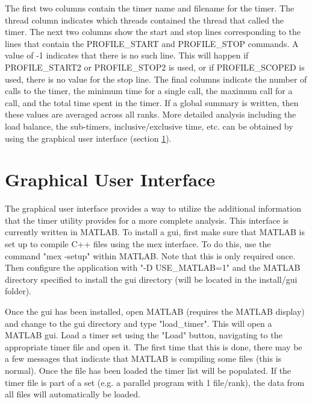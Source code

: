 \documentclass[fleqn,10pt,letterpaper]{article}
\begin{document}
The first two columns contain the timer name and filename for the timer.  
The thread column indicates which threads contained the thread that called the timer.
The next two columns show the start and stop lines corresponding to the lines that
contain the PROFILE\_START and PROFILE\_STOP commands.  A value of -1 indicates that
there is no such line.  This will happen if PROFILE\_START2 or PROFILE\_STOP2 is used,
or if PROFILE\_SCOPED is used, there is no value for the stop line.  
The final columns indicate the number of calls to the timer, the minimum time for a
single call, the maximum call for a call, and the total time spent in the timer.  
If a global summary is written, then these values are averaged across all ranks.  
More detailed analysis including the load balance, the sub-timers, inclusive/exclusive
time, etc. can be obtained by using the graphical user interface (section \ref{sec:gui}).  



\section{Graphical User Interface}  \label{sec:gui}

The graphical user interface provides a way to utilize the additional information
that the timer utility provides for a more complete analysis.  This interface 
is currently written in MATLAB.  To install a gui, first make sure that MATLAB
is set up to compile C++ files using the mex interface.  To do this, use the command
"mex -setup" within MATLAB.  Note that this is only required once.  Then configure 
the application with "-D USE\_MATLAB=1" and the MATLAB directory specified to install 
the gui directory (will be located in the install/gui folder).  

Once the gui has been installed, open MATLAB (requires the MATLAB display) and 
change to the gui directory and type "load\_timer".  This will open a MATLAB gui.  
Load a timer set using the "Load" button, navigating to the appropriate timer 
file and open it.  The first time that this is done, there may be a few messages 
that indicate that MATLAB is compiling some files (this is normal).  
Once the file has been loaded the timer list will be populated.  If the timer file
is part of a set (e.g. a parallel program with 1 file/rank), the data from all files 
will automatically be loaded.  
\end{document}
